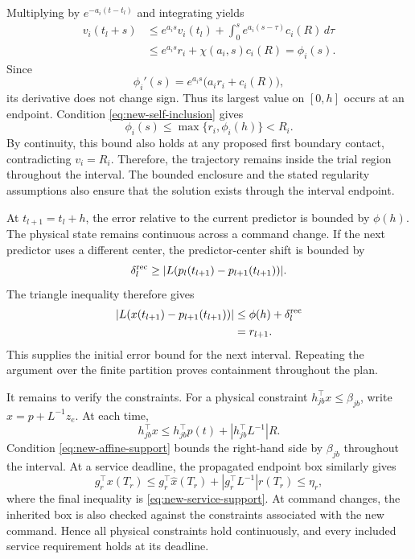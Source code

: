 \documentclass[preprint,12pt]{elsarticle}
\begin{document}
Multiplying by $e^{-a_i(t-t_l)}$ and integrating yields
\[
\begin{aligned}
 v_i(t_l+s)
 &\le e^{a_i s}v_i(t_l)
      +\int_0^s e^{a_i(s-\tau)}c_i(R)\,d\tau\\
 &\le e^{a_i s}r_i+\chi(a_i,s)c_i(R)
  =\phi_i(s).
\end{aligned}
\]
Since
\[
 \phi_i'(s)=e^{a_i s}\bigl(a_i r_i+c_i(R)\bigr),
\]
its derivative does not change sign. Thus its largest value on
$[0,h]$ occurs at an endpoint. Condition
\eqref{eq:new-self-inclusion} gives
\[
 \phi_i(s)\le\max\{r_i,\phi_i(h)\}<R_i.
\]
By continuity, this bound also holds at any proposed first
boundary contact, contradicting $v_i=R_i$. Therefore, the
trajectory remains inside the trial region throughout the interval.
The bounded enclosure and the stated regularity assumptions also
ensure that the solution exists through the interval endpoint.

At $t_{l+1}=t_l+h$, the error relative to the current predictor is
bounded by $\phi(h)$. The physical state remains continuous across
a command change. If the next predictor uses a different center,
the predictor-center shift is bounded by
\begin{equation}
 \delta^{\rm rec}_l\ge
 |L(p_l(t_{l+1})-p_{l+1}(t_{l+1}))|.
 \label{eq:new-recentering-bound}
\end{equation}
The triangle inequality therefore gives
\[
\begin{aligned}
 |L(x(t_{l+1})-p_{l+1}(t_{l+1}))|
 &\le \phi(h)+\delta_l^{\rm rec}\\
 &=r_{l+1}.
\end{aligned}
\]
This supplies the initial error bound for the next interval.
Repeating the argument over the finite partition proves
containment throughout the plan.

It remains to verify the constraints. For a physical constraint
$h_{jb}^{\top}x\le\beta_{jb}$, write $x=p+L^{-1}z_e$. At each time,
\[
 h_{jb}^{\top}x
 \le h_{jb}^{\top}p(t)+|h_{jb}^{\top}L^{-1}|R.
\]
Condition \eqref{eq:new-affine-support} bounds the right-hand side
by $\beta_{jb}$ throughout the interval. At a service deadline,
the propagated endpoint box similarly gives
\[
 g_r^{\top}x(T_r)
 \le g_r^{\top}\widehat x(T_r)
      +|g_r^{\top}L^{-1}|r(T_r)
 \le\eta_r,
\]
where the final inequality is
\eqref{eq:new-service-support}. At command changes, the inherited
box is also checked against the constraints associated with the
new command. Hence all physical constraints hold continuously,
and every included service requirement holds at its deadline.
\end{document}
